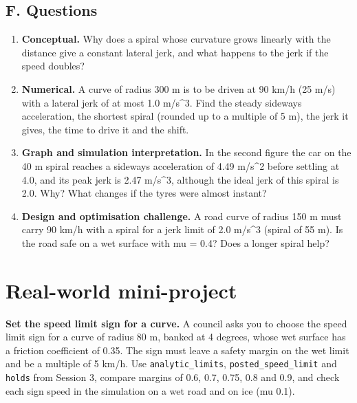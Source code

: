 \documentclass[11pt,a4paper]{article}
\begin{document}
\subsection*{F. Questions}
\begin{enumerate}[nosep]
\item \textbf{Conceptual.} Why does a spiral whose curvature grows linearly with the distance give a constant lateral jerk, and what happens to the jerk if the speed doubles?
\item \textbf{Numerical.} A curve of radius 300 m is to be driven at 90 km/h (25 m/s) with a lateral jerk of at most 1.0 m/s\textasciicircum{}3. Find the steady sideways acceleration, the shortest spiral (rounded up to a multiple of 5 m), the jerk it gives, the time to drive it and the shift.
\item \textbf{Graph and simulation interpretation.} In the second figure the car on the 40 m spiral reaches a sideways acceleration of 4.49 m/s\textasciicircum{}2 before settling at 4.0, and its peak jerk is 2.47 m/s\textasciicircum{}3, although the ideal jerk of this spiral is 2.0. Why? What changes if the tyres were almost instant?
\item \textbf{Design and optimisation challenge.} A road curve of radius 150 m must carry 90 km/h with a spiral for a jerk limit of 2.0 m/s\textasciicircum{}3 (spiral of 55 m). Is the road safe on a wet surface with mu = 0.4? Does a longer spiral help?
\end{enumerate}

\section{Real-world mini-project}
\textbf{Set the speed limit sign for a curve.} A council asks you to choose the speed limit sign for a curve of radius 80 m, banked at 4 degrees, whose wet surface has a friction coefficient of 0.35. The sign must leave a safety margin on the wet limit and be a multiple of 5 km/h. Use \texttt{analytic\_limits}, \texttt{posted\_speed\_limit} and \texttt{holds} from Session 3, compare margins of 0.6, 0.7, 0.75, 0.8 and 0.9, and check each sign speed in the simulation on a wet road and on ice (mu 0.1).
\end{document}
